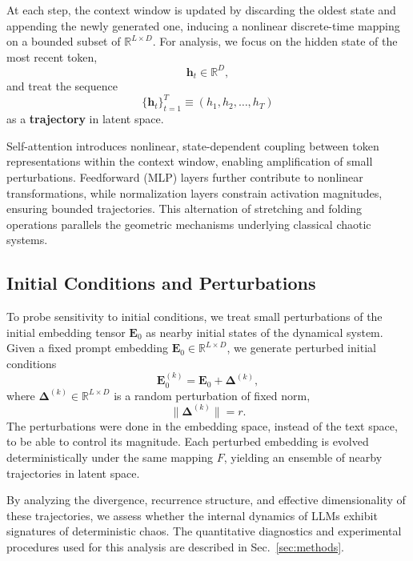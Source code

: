 \documentclass[aip%
 aip,
 amsmath,amssymb,
 reprint,%
]{revtex4-1}
\begin{document}
At each step, the context window is updated by discarding the oldest state and appending the newly generated one, inducing a nonlinear discrete-time mapping on a bounded subset of $\mathbb{R}^{L \times D}$. For analysis, we focus on the hidden state of the most recent token,
\begin{equation}
\mathbf{h}_t \in \mathbb{R}^D,
\end{equation}
and treat the sequence
\begin{equation}
\{\mathbf{h}_t\}_{t=1}^T\equiv (h_1, h_2,\ldots,h_T)
\end{equation}
as a \textbf{trajectory} in latent space.

Self-attention introduces nonlinear, state-dependent coupling between token representations within the context window, enabling amplification of small perturbations. Feedforward (MLP) layers further contribute to nonlinear transformations, while normalization layers constrain activation magnitudes, ensuring bounded trajectories. This alternation of stretching and folding operations parallels the geometric mechanisms underlying classical chaotic systems.

\subsection{Initial Conditions and Perturbations}
\label{subsec:init_conditions}

To probe sensitivity to initial conditions, we treat small perturbations of the initial embedding tensor $\mathbf{E}_0$ as nearby initial states of the dynamical system. Given a fixed prompt embedding $\mathbf{E}_0 \in \mathbb{R}^{L \times D}$, we generate perturbed initial conditions
\begin{equation}
\mathbf{E}_0^{(k)} = \mathbf{E}_0 + \boldsymbol{\Delta}^{(k)},
\end{equation}
where $\boldsymbol{\Delta}^{(k)} \in \mathbb{R}^{L \times D}$ is a random perturbation of fixed norm,
\begin{equation}
\|\boldsymbol{\Delta}^{(k)}\| = r.
\end{equation}
The perturbations were done in the embedding space, instead of the text space, to be able to control its magnitude.
Each perturbed embedding is evolved deterministically under the same mapping $F$, yielding an ensemble of nearby trajectories in latent space.

By analyzing the divergence, recurrence structure, and effective dimensionality of these trajectories, we assess whether the internal dynamics of LLMs exhibit signatures of deterministic chaos. The quantitative diagnostics and experimental procedures used for this analysis are described in Sec.~\ref{sec:methods}.
\end{document}
